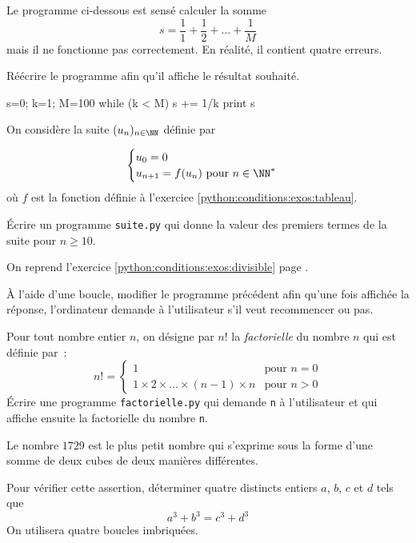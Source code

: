 \begin{exercice}
\item Le programme ci-dessous est sensé calculer la somme %
\[s=\dfrac11+\dfrac12+\ldots+\dfrac1M\] mais il ne fonctionne pas correctement.
En réalité, il contient quatre erreurs.

Réécrire le programme afin qu'il affiche le résultat souhaité.

\begin{pythonexemple}
s=0; k=1; M=100
while (k < M)
    s += 1/k
print s
\end{pythonexemple}
\end{exercice}

\begin{exercice}
On considère la suite $(u_n)_{n\in\NN}$ définie par

\[\begin{cases}
u_0=0\\
u_{n+1} = f(u_n) \text{ pour } n \in \NN^*\\
\end{cases}\]
où $f$ est la fonction définie à l'exercice \ref{python:conditions:exos:tableau}.

Écrire un programme \texttt{suite.py} qui donne la valeur des premiers termes de la suite
pour $n\geqslant10$.
\end{exercice}

\begin{exercice}
On reprend l'exercice \ref{python:conditions:exos:divisible}
page \pageref{python:conditions:exos:divisible}.

À l'aide d'une boucle, modifier le programme précédent afin qu'une fois affichée la réponse,
l'ordinateur demande à l'utilisateur s'il veut recommencer ou pas.
\end{exercice}

\begin{exercice}\label{python:conditions:exos:factorielle}
Pour tout nombre entier $n$, on désigne par $n!$ la \textit{factorielle} du nombre $n$ qui est
définie par~:
\[n!=
\begin{cases}
1 & \text{pour } n = 0\\
1\times2\times\ldots\times(n-1)\times n & \text{pour } n>0
\end{cases}
\]
Écrire une programme \texttt{factorielle.py} qui demande \texttt{n} à l'utilisateur et qui affiche
ensuite la factorielle du nombre \texttt{n}.
\end{exercice}

\begin{exercice}
Le nombre $1729$ est le plus petit nombre qui s'exprime sous la forme d'une somme de deux cubes de deux manières différentes.\medskip

 Pour vérifier cette assertion, déterminer quatre distincts entiers $a$, $b$, $c$ et $d$ tels que
\[a^3+b^3 = c^3 +d^3\]
On utilisera quatre boucles imbriquées.
\end{exercice}


